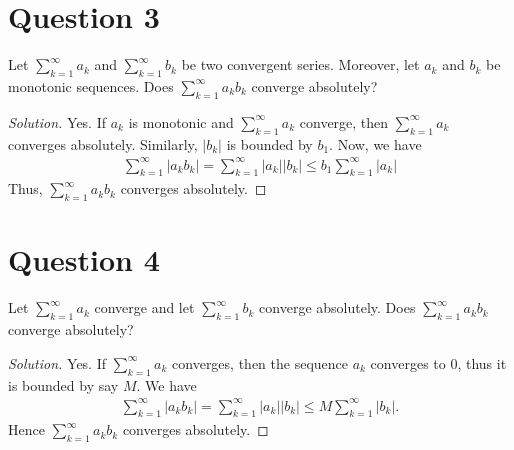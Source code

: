 \documentclass[a4paper]{article}
\theoremstyle{definition}
\begin{document}
\section{Question 3}
Let \(\sum_{k=1}^\infty a_k\) and \(\sum_{k=1}^\infty b_k\) be two convergent series. Moreover, let \(a_k\) and \(b_k\) be monotonic sequences. Does \(\sum_{k=1}^{\infty}a_k b_k\) converge absolutely?
\begin{proof}[Solution]
    Yes. If \(a_k\) is monotonic and \(\sum_{k=1}^{\infty} a_k\) converge, then \(\sum_{k=1}^\infty a_k\) converges absolutely. Similarly, \(|b_k|\) is bounded by \(b_1\). Now, we have
    \begin{align*}
        \sum_{k=1}^{\infty} |a_k b_k | = \sum_{k=1}^{\infty} |a_k || b_k | \leq b_1 \sum_{k=1}^{\infty} |a_k |
    \end{align*}
    Thus, \(\sum_{k=1}^\infty a_k b_k\) converges absolutely.
\end{proof}
\section{Question 4}
Let \(\sum_{k=1}^\infty a_k\) converge and let \(\sum_{k=1}^\infty b_k\) converge absolutely. Does \(\sum_{k=1}^\infty a_k b_k\) converge absolutely?
\begin{proof}[Solution]
    Yes. If \(\sum_{k=1}^\infty a_k\) converges, then the sequence \(a_k\) converges to \(0\), thus it is bounded by say \(M\). We have
    \begin{align*}
        \sum_{k=1}^{\infty} |a_k b_k| = \sum_{k=1}^{\infty} |a_k | | b_k| \leq M \sum_{k=1}^{\infty} |b_k| \text{.}
    \end{align*}
    Hence \(\sum_{k=1}^{\infty} a_k b_k\) converges absolutely.
\end{proof}
\end{document}
